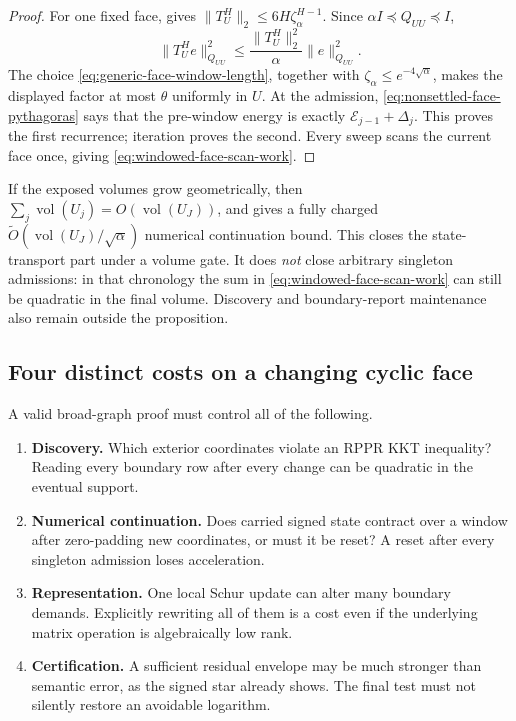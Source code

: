 \begin{proof}
For one fixed face,  gives
$\|T_U^H\|_2\leq6H\zeta_\alpha^{H-1}$.  Since
$\alpha I\preceq Q_{UU}\preceq I$,
\begin{equation*}
 \|T_U^He\|_{Q_{UU}}^2
 \leq
 \frac{\|T_U^H\|_2^2}{\alpha}
 \|e\|_{Q_{UU}}^2.
\end{equation*}
The choice \eqref{eq:generic-face-window-length}, together with
$\zeta_\alpha\leq e^{-4\sqrt\alpha}$, makes the displayed factor at most
$\theta$ uniformly in $U$.  At the admission,
\eqref{eq:nonsettled-face-pythagoras} says that the pre-window energy is
exactly $\mathcal E_{j-1}+\Delta_j$.  This proves the first recurrence;
iteration proves the second.  Every sweep scans the current face once, giving
\eqref{eq:windowed-face-scan-work}.
\end{proof}

If the exposed volumes grow geometrically, then
$\sum_j\operatorname{vol}(U_j)=
O(\operatorname{vol}(U_J))$, and
 gives a fully charged
$\widetilde O(\operatorname{vol}(U_J)/\sqrt\alpha)$ numerical
continuation bound.  This closes the state-transport part under a volume gate.
It does \emph{not} close arbitrary singleton admissions: in that chronology
the sum in \eqref{eq:windowed-face-scan-work} can still be quadratic in the
final volume.  Discovery and boundary-report maintenance also remain outside
the proposition.

\subsection{Four distinct costs on a changing cyclic face}

A valid broad-graph proof must control all of the following.

\begin{enumerate}[leftmargin=*]
\item \textbf{Discovery.}  Which exterior coordinates violate an RPPR KKT
      inequality?  Reading every boundary row after every change can be
      quadratic in the eventual support.
\item \textbf{Numerical continuation.}  Does carried signed state contract
      over a window after zero-padding new coordinates, or must it be reset?
      A reset after every singleton admission loses acceleration.
\item \textbf{Representation.}  One local Schur update can alter many
      boundary demands.  Explicitly rewriting all of them is a cost even if
      the underlying matrix operation is algebraically low rank.
\item \textbf{Certification.}  A sufficient residual envelope may be much
      stronger than semantic error, as the signed star already shows.  The
      final test must not silently restore an avoidable logarithm.
\end{enumerate}

